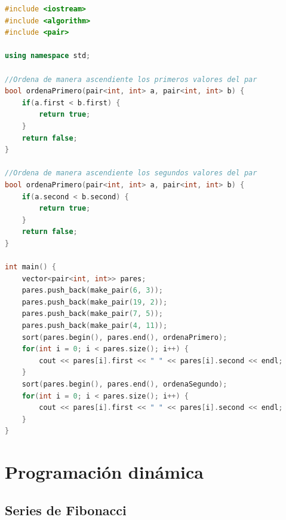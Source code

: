 \documentclass{article}
\begin{document}
\begin{lstlisting}[language=C++, caption=Ordenamiento estandar sobrecargada]
#include <iostream>
#include <algorithm>
#include <pair>

using namespace std;

//Ordena de manera ascendiente los primeros valores del par
bool ordenaPrimero(pair<int, int> a, pair<int, int> b) {
    if(a.first < b.first) {
        return true;
    }
    return false;
}

//Ordena de manera ascendiente los segundos valores del par
bool ordenaPrimero(pair<int, int> a, pair<int, int> b) {
    if(a.second < b.second) {
        return true;
    }
    return false;
}

int main() {
    vector<pair<int, int>> pares;
    pares.push_back(make_pair(6, 3));
    pares.push_back(make_pair(19, 2));
    pares.push_back(make_pair(7, 5));
    pares.push_back(make_pair(4, 11));
    sort(pares.begin(), pares.end(), ordenaPrimero);
    for(int i = 0; i < pares.size(); i++) {
        cout << pares[i].first << " " << pares[i].second << endl;
    }
    sort(pares.begin(), pares.end(), ordenaSegundo);
    for(int i = 0; i < pares.size(); i++) {
        cout << pares[i].first << " " << pares[i].second << endl;
    }
}
\end{lstlisting}

\section{Programación dinámica}

\subsection{Series de Fibonacci}
\end{document}
